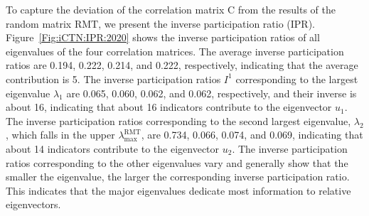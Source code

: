 \documentclass[preprint,3p,times,sort&compress]{elsarticle}
\begin{document}
To capture the deviation of the correlation matrix $\mathrm{C}$ from the results of the random matrix $\mathrm{RMT}$, we present the inverse participation ratio (IPR). Figure~\ref{Fig:iCTN:IPR:2020} shows the inverse participation ratios of all eigenvalues of the four correlation matrices. The average inverse participation ratios are 0.194, 0.222, 0.214, and 0.222, respectively, indicating that the average contribution is 5. The inverse participation ratios $I^1$ corresponding to the largest eigenvalue $\lambda_1$ are 0.065, 0.060, 0.062, and 0.062, respectively, and their inverse is about 16, indicating that about 16 indicators contribute to the eigenvector $u_1$. The inverse participation ratios corresponding to the second largest eigenvalue, $\lambda_2$, which falls in the upper $\lambda_{\max }^{\mathrm{RMT}}$, are 0.734, 0.066, 0.074, and 0.069, indicating that about 14 indicators contribute to the eigenvector $u_2$. The inverse participation ratios corresponding to the other eigenvalues vary and generally show that the smaller the eigenvalue, the larger the corresponding inverse participation ratio. This indicates that the major eigenvalues dedicate most information to relative eigenvectors.
\end{document}
